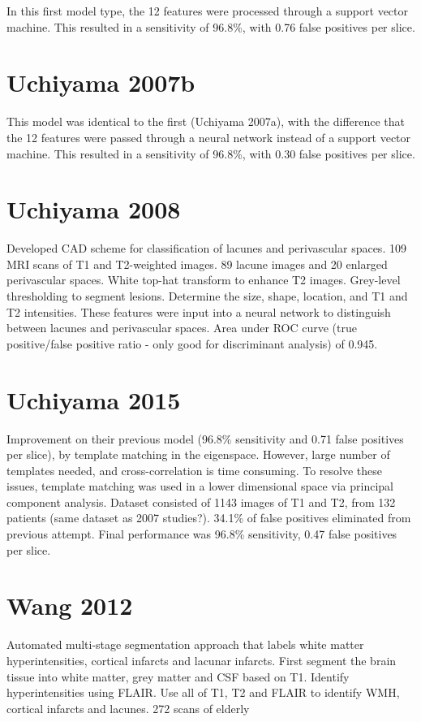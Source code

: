 In this first model type, the 12 features were processed through a support vector machine. This resulted in a sensitivity of 96.8\%, with 0.76 false positives per slice.

\section{Uchiyama 2007b}

This model was identical to the first (Uchiyama 2007a), with the difference that the 12 features were passed through a neural network instead of a support vector machine. This resulted in a sensitivity of 96.8\%, with 0.30 false positives per slice.

\section{Uchiyama 2008}

Developed CAD scheme for classification of lacunes and perivascular spaces. 109 MRI scans of T1 and T2-weighted images. 89 lacune images and 20 enlarged perivascular spaces. White top-hat transform to enhance T2 images. Grey-level thresholding to segment lesions. Determine the size, shape, location, and T1 and T2 intensities. These features were input into a neural network to distinguish between lacunes and perivascular spaces. Area under ROC curve (true positive/false positive ratio - only good for discriminant analysis) of 0.945.

\section{Uchiyama 2015}

Improvement on their previous model (96.8\% sensitivity and 0.71 false positives per slice), by template matching in the eigenspace. However, large number of templates needed, and cross-correlation is time consuming. To resolve these issues, template matching was used in a lower dimensional space via principal component analysis. Dataset consisted of 1143 images of T1 and T2, from 132 patients (same dataset as 2007 studies?). 34.1\% of false positives eliminated from previous attempt. Final performance was 96.8\% sensitivity, 0.47 false positives per slice.

\section{Wang 2012}

Automated multi-stage segmentation approach that labels white matter hyperintensities, cortical infarcts and lacunar infarcts. First segment the brain tissue into white matter, grey matter and CSF based on T1. Identify hyperintensities using FLAIR. Use all of T1, T2 and FLAIR to identify WMH, cortical infarcts and lacunes. 272 scans of elderly

